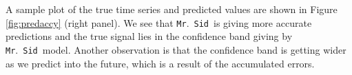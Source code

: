 \documentclass[fleqn]{article}
\let\oldref\ref
\renewcommand{\ref}[1]{(\oldref{#1})}
\newcommand{\mrsid}{{\sc \texttt{Mr}.~\texttt{Sid}}}
\begin{document}

A sample plot of the true time series and predicted values are shown in Figure \oldref{fig:predaccy} (right panel). We see that \mrsid~is giving more accurate predictions and the true signal lies in the confidence band giving by \mrsid~model. Another observation is that the confidence band is getting wider as we predict into the future, which is a result of the accumulated errors.



%
%
%
\end{document}
